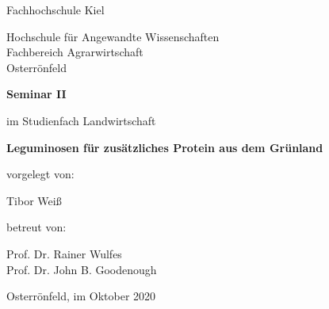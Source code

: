 
\begin{titlepage}
\centering

\begingroup
    \Large{Fachhochschule Kiel}
    \par
\endgroup

\begingroup
    \large{Hochschule für Angewandte Wissenschaften \\
        Fachbereich Agrarwirtschaft \\
        Osterrönfeld}
    \par
\endgroup


\vspace{3cm}


\begingroup
    \Large
    \bfseries{Seminar II}
    \par
\endgroup

\vspace{0.1cm}

im Studienfach Landwirtschaft

\vspace{2cm}

\hrulefill

\vspace{0.5cm}
\begingroup
    \LARGE
    \bfseries{Leguminosen für zusätzliches Protein aus dem Grünland}
    \par
\endgroup
\vspace{0.5cm}
\hrulefill
\vspace{2cm}

vorgelegt von:

\begingroup
    \large{Tibor Weiß}
    \par
\endgroup

\vspace{1.5cm}

betreut von:

\begingroup
    \large{Prof. Dr. Rainer Wulfes \\
        Prof. Dr. John B. Goodenough}
    \par
\endgroup

\vspace{1cm}

Osterrönfeld, im Oktober 2020

\end{titlepage}
